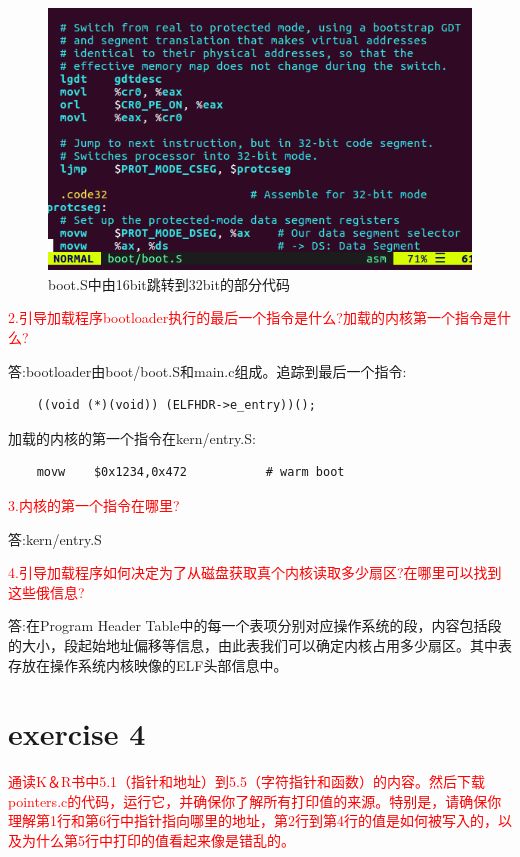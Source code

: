 \documentclass[]{ctexrep}
\begin{document}
\begin{figure}[htbp!]
	\centering\includegraphics[scale=0.5]{figure/real2pro}
	\caption{boot.S中由16bit跳转到32bit的部分代码}
\end{figure}
\textcolor{red}{2.引导加载程序bootloader执行的最后一个指令是什么?加载的内核第一个指令是什么?}\par
答:bootloader由boot/boot.S和main.c组成。追踪到最后一个指令:
\begin{lstlisting}
	((void (*)(void)) (ELFHDR->e_entry))();
\end{lstlisting}\par
加载的内核的第一个指令在kern/entry.S:
\begin{lstlisting}
	movw    $0x1234,0x472           # warm boot
\end{lstlisting}

\textcolor{red}{3.内核的第一个指令在哪里?}\par
答:kern/entry.S\par
\textcolor{red}{4.引导加载程序如何决定为了从磁盘获取真个内核读取多少扇区?在哪里可以找到这些俄信息?}\par
答:在Program Header Table中的每一个表项分别对应操作系统的段，内容包括段的大小，段起始地址偏移等信息，由此表我们可以确定内核占用多少扇区。其中表存放在操作系统内核映像的ELF头部信息中。

\section{exercise 4}
\textcolor{red}{通读K＆R书中5.1（指针和地址）到5.5（字符指针和函数）的内容。然后下载pointers.c的代码，运行它，并确保你了解所有打印值的来源。特别是，请确保你理解第1行和第6行中指针指向哪里的地址，第2行到第4行的值是如何被写入的，以及为什么第5行中打印的值看起来像是错乱的。}
\end{document}
